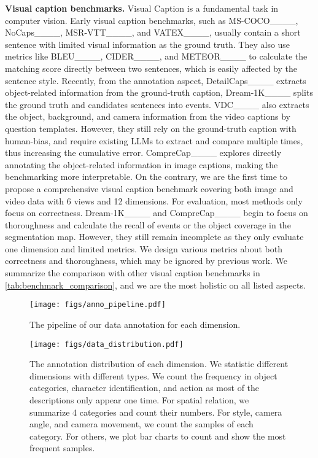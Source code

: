 \noindent\textbf{Visual caption benchmarks.}
Visual Caption is a fundamental task in computer vision. Early visual caption benchmarks, such as MS-COCO____, NoCaps____, MSR-VTT____, and VATEX____, usually contain a short sentence with limited visual information as the ground truth. They also use metrics like BLEU____, CIDER____, and METEOR____ to calculate the matching score directly between two sentences, which is easily affected by the sentence style. Recently, from the annotation aspect, DetailCaps____ extracts object-related information from the ground-truth caption, Dream-1K____ splits the ground truth and candidates sentences into events. VDC____ also extracts the object, background, and camera information from the video captions by question templates. However, they still rely on the ground-truth caption with human-bias, and require existing LLMs to extract and compare multiple times, thus increasing the cumulative error. CompreCap____ explores directly annotating the object-related information in image captions, making the benchmarking more interpretable. On the contrary, we are the first time to propose a comprehensive visual caption benchmark covering both image and video data with 6 views and 12 dimensions. For evaluation, most methods only focus on correctness. Dream-1K____ and CompreCap____ begin to focus on thoroughness and calculate the recall of events or the object coverage in the segmentation map. However, they still remain incomplete as they only evaluate one dimension and limited metrics. We design various metrics about both correctness and thoroughness, which may be ignored by previous work. We summarize the comparison with other visual caption benchmarks in \cref{tab:benchmark_comparison}, and we are the most holistic on all listed aspects.

\begin{figure}[!t]
\centering
\texttt{[image: figs/anno\_pipeline.pdf]}
\caption{The pipeline of our data annotation for each dimension.}
\label{fig:anno_pipeline}
\vspace{-12pt}
\end{figure}


\begin{figure*}[!t]
\centering
\texttt{[image: figs/data\_distribution.pdf]}
\vspace{-8pt}
\caption{The annotation distribution of each dimension. We statistic different dimensions with different types. We count the frequency in object categories, character identification, and action as most of the descriptions only appear one time. For spatial relation, we summarize 4 categories and count their numbers. For style, camera angle, and camera movement, we count the samples of each category. For others, we plot bar charts to count and show the most frequent samples.}
\label{fig:gt_distribution}
\end{figure*}